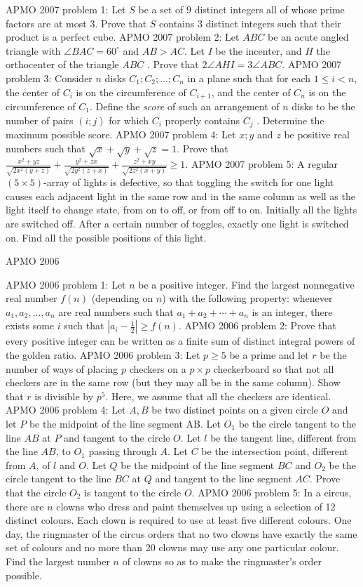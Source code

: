 APMO 2007 problem 1:  Let $S$ be a set of $9$ distinct integers all of whose prime factors are at most $3.$ Prove that $S$ contains $3$ distinct integers such that their product is a perfect cube. 
APMO 2007 problem 2:  Let $ABC$ be an acute angled triangle with $\angle{BAC}=60^\circ$ and $AB > AC$. Let $I$ be the incenter, and $H$ the orthocenter of the triangle $ABC$ . Prove that $2\angle{AHI}= 3\angle{ABC}$. 
APMO 2007 problem 3:  Consider $n$ disks $C_1; C_2; ... ; C_n$ in a plane such that for each $1 \leq i < n$, the center of $C_i$ is on the circumference of $C_{i+1}$, and the center of $C_n$ is on the circumference of $C_1$. Define the \textit{score} of such an arrangement of $n$ disks to be the number of pairs $(i; j )$ for which $C_i$ properly contains $C_j$ . Determine the maximum possible score. 
APMO 2007 problem 4:  Let $x; y$ and $z$ be positive real numbers such that $\sqrt{x}+\sqrt{y}+\sqrt{z}= 1$. Prove that $\frac{x^2+yz}{\sqrt{2x^2(y+z)}}+\frac{y^2+zx}{\sqrt{2y^2(z+x)}}+\frac{z^2+xy}{\sqrt{2z^2(x+y)}}\geq 1.$ 
APMO 2007 problem 5:  A regular $ (5 \times 5)$-array of lights is defective, so that toggling the switch for one light causes each adjacent light in the same row and in the same column as well as the light itself to change state, from on to off, or from off to on. Initially all the lights are switched off. After a certain number of toggles, exactly one light is switched on. Find all the possible positions of this light. 

APMO 2006 

APMO 2006 problem 1:  Let $n$ be a positive integer. Find the largest nonnegative real number $f(n)$ (depending on $n$) with the following property: whenever $a_1,a_2,...,a_n$ are real numbers such that $a_1+a_2+\cdots +a_n$ is an integer, there exists some $i$ such that  $\left|a_i-\frac{1}{2}\right|\ge f(n)$. 
APMO 2006 problem 2:  Prove that every positive integer can be written as a finite sum of distinct integral powers of the golden ratio. 
APMO 2006 problem 3:  Let $p\ge5$ be a prime and let $r$ be the number of ways of placing $p$ checkers on a $p\times p$ checkerboard so that not all checkers are in the same row (but they may all be in the same column). Show that $r$ is divisible by $p^5$. Here, we assume that all the checkers are identical. 
APMO 2006 problem 4:  Let $A,B$ be two distinct points on a given circle $O$ and let $P$ be the midpoint of the line segment AB. Let $O_1$ be the circle tangent to the line $AB$ at $P$ and tangent to the circle $O$. Let $l$ be the tangent line, different from the line $AB$, to $O_1$ passing through $A$. Let $C$ be the intersection point, different from $A$, of $l$ and $O$. Let $Q$ be the midpoint of the line segment $BC$ and $O_2$ be the circle tangent to the line $BC$ at $Q$ and tangent to the line segment $AC$. Prove that the circle $O_2$ is tangent to the circle $O$. 
APMO 2006 problem 5:  In a circus, there are $n$ clowns who dress and paint themselves up using a selection of 12 distinct colours. Each clown is required to use at least five different colours. One day, the ringmaster of the circus orders that no two clowns have exactly the same set of colours and no more than 20 clowns may use any one particular colour. Find the largest number $n$ of clowns so as to make the ringmaster's order possible. 

